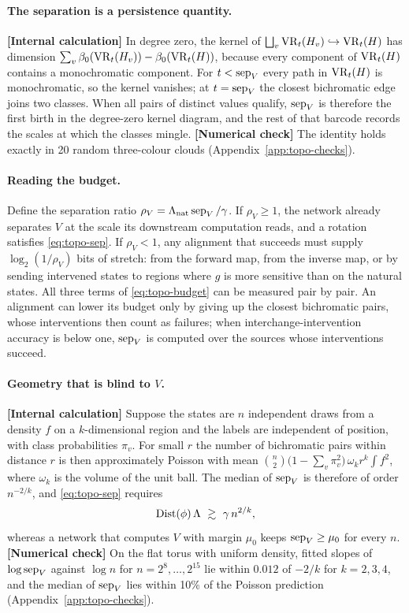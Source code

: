 \documentclass[11pt,a4paper]{article}
\newcommand{\evl}[2]{{\small\bfseries\color{#1}[#2]}}
\newcommand{\LCalc}{\evl{ccalc}{Internal calculation}}
\newcommand{\LNum}{\evl{cnum}{Numerical check}}
\begin{document}
\paragraph{The separation is a persistence quantity.} \LCalc{} In degree zero,
the kernel of $\bigsqcup_v\mathrm{VR}_t(H_v)\hookrightarrow\mathrm{VR}_t(H)$ has dimension
$\sum_v\beta_0(\mathrm{VR}_t(H_v))-\beta_0(\mathrm{VR}_t(H))$, because every component of
$\mathrm{VR}_t(H)$ contains a monochromatic component. For $t<\operatorname{sep}_V$ every path in
$\mathrm{VR}_t(H)$ is monochromatic, so the kernel vanishes; at $t=\operatorname{sep}_V$ the closest
bichromatic edge joins two classes. When all pairs of distinct values
qualify, $\operatorname{sep}_V$ is therefore the first birth in the degree-zero kernel
diagram, and the rest of that barcode records the scales at which the classes
mingle. \LNum{} The identity holds exactly in 20 random three-colour clouds
(Appendix~\ref{app:topo-checks}).

\paragraph{Reading the budget.} Define the separation ratio
$\rho_V=\Lambda_{\rm nat}\operatorname{sep}_V/\gamma$. If $\rho_V\ge1$, the network already
separates $V$ at the scale its downstream computation reads, and a rotation
satisfies \eqref{eq:topo-sep}. If $\rho_V<1$, any alignment that succeeds must
supply $\log_2(1/\rho_V)$ bits of stretch: from the forward map, from the
inverse map, or by sending intervened states to regions where $g$ is more
sensitive than on the natural states. All three terms of
\eqref{eq:topo-budget} can be measured pair by pair. An alignment can lower
its budget only by giving up the closest bichromatic pairs, whose
interventions then count as failures; when interchange-intervention accuracy
is below one, $\operatorname{sep}_V$ is computed over the sources whose interventions
succeed.

\paragraph{Geometry that is blind to $V$.} \LCalc{} Suppose the states are $n$
independent draws from a density $f$ on a $k$-dimensional region and the
labels are independent of position, with class probabilities $\pi_v$. For
small $r$ the number of bichromatic pairs within distance $r$ is then
approximately Poisson \cite{jammalamadaka1986} with mean
$\binom n2\bigl(1-\sum_v\pi_v^2\bigr)\,\omega_kr^k\!\int\!f^2$, where
$\omega_k$ is the volume of the unit ball. The median of $\operatorname{sep}_V$ is therefore
of order $n^{-2/k}$, and \eqref{eq:topo-sep} requires
\begin{equation}
\operatorname{Dist}(\phi)\,\Lambda\ \gtrsim\ \gamma\,n^{2/k},
\label{eq:topo-blind}
\end{equation}
whereas a network that computes $V$ with margin $\mu_0$ keeps
$\operatorname{sep}_V\ge\mu_0$ for every $n$. \LNum{} On the flat torus with uniform
density, fitted slopes of $\log\operatorname{sep}_V$ against $\log n$ for
$n=2^8,\dots,2^{15}$ lie within $0.012$ of $-2/k$ for $k=2,3,4$, and the
median of $\operatorname{sep}_V$ lies within 10\% of the Poisson prediction
(Appendix~\ref{app:topo-checks}).
\end{document}
